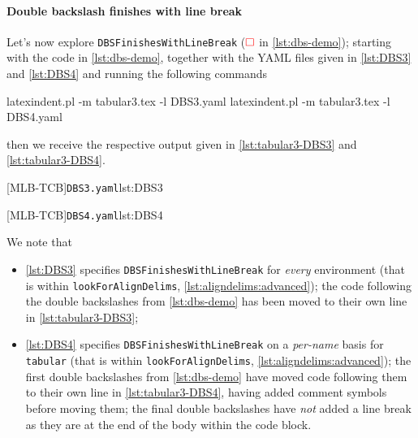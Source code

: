  \paragraph{Double backslash finishes with line break}
  \begin{example}
  Let's now explore \texttt{DBSFinishesWithLineBreak} ($\color{red}\square$ in
  \cref{lst:dbs-demo}); starting with the code in \cref{lst:dbs-demo}, together with the
  YAML files given in \cref{lst:DBS3} and \cref{lst:DBS4} and running the following
  commands   

  \begin{commandshell}
latexindent.pl -m tabular3.tex -l DBS3.yaml
latexindent.pl -m tabular3.tex -l DBS4.yaml
\end{commandshell}

  then we receive the respective output given in \cref{lst:tabular3-DBS3} and
  \cref{lst:tabular3-DBS4}.

  \begin{cmhtcbraster}
   [MLB-TCB]{\texttt{DBS3.yaml}}{lst:DBS3}
  \end{cmhtcbraster}

  \begin{cmhtcbraster}
   [MLB-TCB]{\texttt{DBS4.yaml}}{lst:DBS4}
  \end{cmhtcbraster}

  We note that
  \begin{itemize}
   \item \cref{lst:DBS3} specifies \texttt{DBSFinishesWithLineBreak} for
         \emph{every} environment (that is within \texttt{lookForAlignDelims},
         \vref{lst:aligndelims:advanced});
         the code following the double backslashes from \cref{lst:dbs-demo} has been moved to
         their own line in \cref{lst:tabular3-DBS3};
   \item \cref{lst:DBS4} specifies \texttt{DBSFinishesWithLineBreak} on a
         \emph{per-name} basis for \texttt{tabular} (that is within \texttt{lookForAlignDelims},
         \vref{lst:aligndelims:advanced});
         the first double backslashes from \cref{lst:dbs-demo} have moved code following them to
         their own line in \cref{lst:tabular3-DBS4}, having added comment symbols before moving
         them; the final double backslashes have \emph{not} added a line break as they are at the
         end of the body within the code block.
  \end{itemize}
  \end{example}

